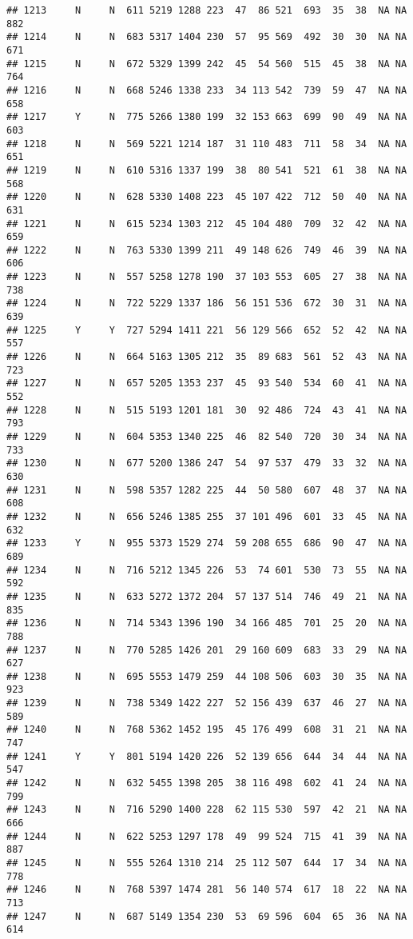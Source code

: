 \documentclass[]{article}
\begin{document}
\begin{verbatim}
## 1213     N     N  611 5219 1288 223  47  86 521  693  35  38  NA NA  882
## 1214     N     N  683 5317 1404 230  57  95 569  492  30  30  NA NA  671
## 1215     N     N  672 5329 1399 242  45  54 560  515  45  38  NA NA  764
## 1216     N     N  668 5246 1338 233  34 113 542  739  59  47  NA NA  658
## 1217     Y     N  775 5266 1380 199  32 153 663  699  90  49  NA NA  603
## 1218     N     N  569 5221 1214 187  31 110 483  711  58  34  NA NA  651
## 1219     N     N  610 5316 1337 199  38  80 541  521  61  38  NA NA  568
## 1220     N     N  628 5330 1408 223  45 107 422  712  50  40  NA NA  631
## 1221     N     N  615 5234 1303 212  45 104 480  709  32  42  NA NA  659
## 1222     N     N  763 5330 1399 211  49 148 626  749  46  39  NA NA  606
## 1223     N     N  557 5258 1278 190  37 103 553  605  27  38  NA NA  738
## 1224     N     N  722 5229 1337 186  56 151 536  672  30  31  NA NA  639
## 1225     Y     Y  727 5294 1411 221  56 129 566  652  52  42  NA NA  557
## 1226     N     N  664 5163 1305 212  35  89 683  561  52  43  NA NA  723
## 1227     N     N  657 5205 1353 237  45  93 540  534  60  41  NA NA  552
## 1228     N     N  515 5193 1201 181  30  92 486  724  43  41  NA NA  793
## 1229     N     N  604 5353 1340 225  46  82 540  720  30  34  NA NA  733
## 1230     N     N  677 5200 1386 247  54  97 537  479  33  32  NA NA  630
## 1231     N     N  598 5357 1282 225  44  50 580  607  48  37  NA NA  608
## 1232     N     N  656 5246 1385 255  37 101 496  601  33  45  NA NA  632
## 1233     Y     N  955 5373 1529 274  59 208 655  686  90  47  NA NA  689
## 1234     N     N  716 5212 1345 226  53  74 601  530  73  55  NA NA  592
## 1235     N     N  633 5272 1372 204  57 137 514  746  49  21  NA NA  835
## 1236     N     N  714 5343 1396 190  34 166 485  701  25  20  NA NA  788
## 1237     N     N  770 5285 1426 201  29 160 609  683  33  29  NA NA  627
## 1238     N     N  695 5553 1479 259  44 108 506  603  30  35  NA NA  923
## 1239     N     N  738 5349 1422 227  52 156 439  637  46  27  NA NA  589
## 1240     N     N  768 5362 1452 195  45 176 499  608  31  21  NA NA  747
## 1241     Y     Y  801 5194 1420 226  52 139 656  644  34  44  NA NA  547
## 1242     N     N  632 5455 1398 205  38 116 498  602  41  24  NA NA  799
## 1243     N     N  716 5290 1400 228  62 115 530  597  42  21  NA NA  666
## 1244     N     N  622 5253 1297 178  49  99 524  715  41  39  NA NA  887
## 1245     N     N  555 5264 1310 214  25 112 507  644  17  34  NA NA  778
## 1246     N     N  768 5397 1474 281  56 140 574  617  18  22  NA NA  713
## 1247     N     N  687 5149 1354 230  53  69 596  604  65  36  NA NA  614

\end{verbatim}
\end{document}
